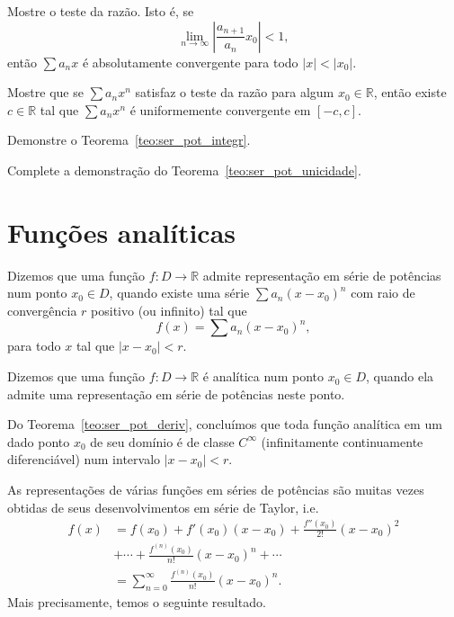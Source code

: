 \begin{exer}
  Mostre o teste da razão. Isto é, se
  \begin{equation}
    \lim_{n\to\infty} \left|\frac{a_{n+1}}{a_n}x_0\right| < 1,
  \end{equation}
então $\sum a_nx$ é absolutamente convergente para todo $|x|<|x_0|$.
\end{exer}

\begin{exer}
  Mostre que se $\sum a_nx^n$ satisfaz o teste da razão para algum $x_0\in\mathbb{R}$, então existe $c\in\mathbb{R}$ tal que $\sum a_nx^n$ é uniformemente convergente em $[-c, c]$.
\end{exer}

\begin{exer}\label{exer:teo_ser_pot_integr}
  Demonstre o Teorema~\ref{teo:ser_pot_integr}.
\end{exer}

\begin{exer}\label{exer:teo_ser_pot_unicidade}
  Complete a demonstração do Teorema~\ref{teo:ser_pot_unicidade}.
\end{exer}

\section{Funções analíticas}\label{cap_ssfuncoes_sec_fun_analit}

Dizemos que uma função $f:D\to\mathbb{R}$ admite representação em série de potências num ponto $x_0\in D$, quando existe uma série $\sum a_n(x-x_0)^n$ com raio de convergência $r$ positivo (ou infinito) tal que
\begin{equation}
  f(x) = \sum a_n(x-x_0)^n,
\end{equation}
para todo $x$ tal que $|x-x_0|<r$.

\begin{defn}
  Dizemos que uma função $f:D\to\mathbb{R}$ é analítica num ponto $x_0\in D$, quando ela admite uma representação em série de potências neste ponto.
\end{defn}

\begin{obs}
  Do Teorema~\ref{teo:ser_pot_deriv}, concluímos que toda função analítica em um dado ponto $x_0$ de seu domínio é de classe $C^\infty$ (infinitamente continuamente diferenciável) num intervalo $|x-x_0|<r$.
\end{obs}

As representações de várias funções em séries de potências são muitas vezes obtidas de seus desenvolvimentos em série de Taylor, i.e.
\begin{align}
  f(x) &= f(x_0) + f'(x_0)(x-x_0) + \frac{f''(x_0)}{2!}(x-x_0)^2 \nonumber \\
  &+ \cdots + \frac{f^{(n)}(x_0)}{n!}(x-x_0)^n + \cdots \\
  &= \sum_{n=0}^\infty \frac{f^{(n)}(x_0)}{n!}(x-x_0)^n.
\end{align}
Mais precisamente, temos o seguinte resultado.


